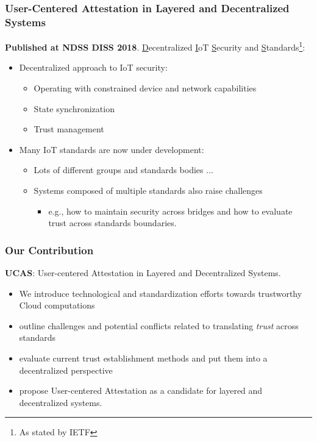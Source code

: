 \documentclass[aspectratio=169] {beamer}
\begin{document}
\begin{frame}\frametitle{User-Centered Attestation in Layered and Decentralized Systems}
\textbf{Published at NDSS DISS 2018}.
\vfill
\uline{D}ecentralized \uline{I}oT \uline{S}ecurity and \uline{S}tandards\footnote{\scriptsize As stated by IETF}:
\begin{itemize}
	\item Decentralized approach to IoT security:
	\begin{itemize}
		\item Operating with constrained device and network capabilities
		\item State synchronization
		\item Trust management
	\end{itemize}
	\item Many IoT standards are now under development:
	\begin{itemize}
		\item Lots of different groups and standards bodies ...
		\item Systems composed of multiple standards also raise challenges
		\begin{itemize}
			\item e.g., how to maintain security across bridges and how to evaluate trust across standards boundaries.
		\end{itemize}
	\end{itemize}
\end{itemize}
\end{frame}

\begin{frame}\frametitle{Our Contribution}

\textbf{UCAS}: User-centered Attestation in Layered and Decentralized Systems.
\vfill

  \begin{itemize}
  \item We introduce technological and standardization efforts towards trustworthy Cloud computations
  \item outline challenges and potential conflicts related to translating \emph{trust} across standards
  \item evaluate current trust establishment methods and put them into a decentralized perspective
  \item propose User-centered Attestation as a candidate for layered and decentralized systems.
  \end{itemize}
\end{frame}
\end{document}
